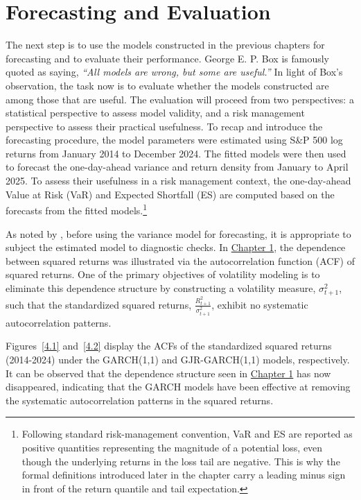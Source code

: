 \chapter{Forecasting and Evaluation}
\label{chap:4}

The next step is to use the models constructed in the previous chapters for forecasting and to evaluate their performance. George E. P. Box is famously quoted as saying, \textit{“All models are wrong, but some are useful.”} In light of Box’s observation, the task now is to evaluate whether the models constructed are among those that are useful. The evaluation will proceed from two perspectives: a statistical perspective to assess model validity, and a risk management perspective to assess their practical usefulness.
\newpage
To recap and introduce the forecasting procedure, the model parameters were estimated using S\&P 500 log returns from January 2014 to December 2024. The fitted models were then used to forecast the one-day-ahead variance and return density from January to April 2025. To assess their usefulness in a risk management context, the one-day-ahead Value at Risk (VaR) and Expected Shortfall (ES) are computed based on the forecasts from the fitted models.\footnote{Following standard risk-management convention, VaR and ES are reported as positive quantities representing the magnitude of a potential loss, even though the underlying returns in the loss tail are negative. This is why the formal definitions introduced later in the chapter carry a leading minus sign in front of the return quantile and tail expectation.}

As noted by , before using the variance model for forecasting, it is appropriate to subject the estimated model to diagnostic checks. In \hyperref[chap:1]{Chapter 1}, the dependence between squared returns was illustrated via the autocorrelation function (ACF) of squared returns. One of the primary objectives of volatility modeling is to eliminate this dependence structure by constructing a volatility measure, $\sigma^2_{t+1}$, such that the standardized squared returns, $\frac{R^2_{t+1}}{\sigma^2_{t+1}}$, exhibit no systematic autocorrelation patterns.

Figures~\ref{4.1} and~\ref{4.2} display the ACFs of the standardized squared returns (2014-2024) under the GARCH(1,1) and GJR-GARCH(1,1) models, respectively. It can be observed that the dependence structure seen in \hyperref[chap:1]{Chapter 1} has now disappeared, indicating that the GARCH models have been effective at removing the systematic autocorrelation patterns in the squared returns.

